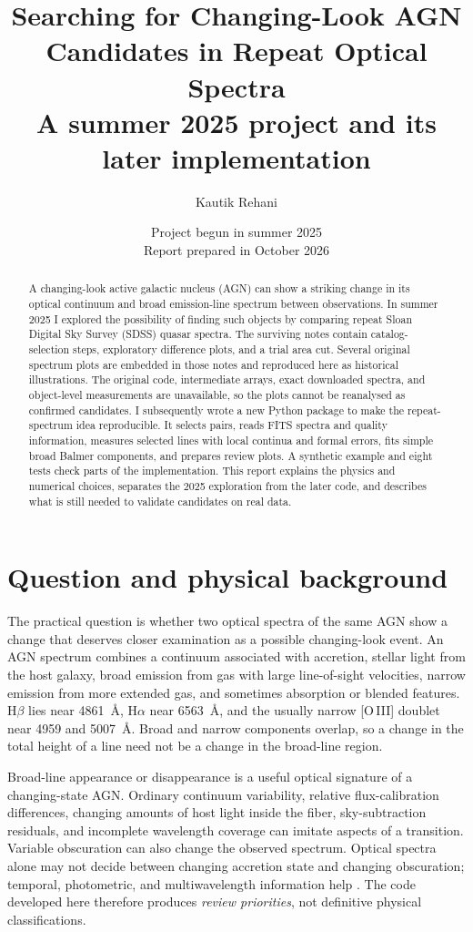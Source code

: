 \documentclass[11pt,a4paper]{article}
\title{Searching for Changing-Look AGN Candidates in Repeat Optical Spectra\\
\large A summer 2025 project and its later implementation}
\author{Kautik Rehani}
\date{Project begun in summer 2025\\Report prepared in October 2026}
\begin{document}
\maketitle

\begin{abstract}
A changing-look active galactic nucleus (AGN) can show a striking change in its optical continuum and broad emission-line spectrum between observations. In summer 2025 I explored the possibility of finding such objects by comparing repeat Sloan Digital Sky Survey (SDSS) quasar spectra. The surviving notes contain catalog-selection steps, exploratory difference plots, and a trial area cut. Several original spectrum plots are embedded in those notes and reproduced here as historical illustrations. The original code, intermediate arrays, exact downloaded spectra, and object-level measurements are unavailable, so the plots cannot be reanalysed as confirmed candidates. I subsequently wrote a new Python package to make the repeat-spectrum idea reproducible. It selects pairs, reads FITS spectra and quality information, measures selected lines with local continua and formal errors, fits simple broad Balmer components, and prepares review plots. A synthetic example and eight tests check parts of the implementation. This report explains the physics and numerical choices, separates the 2025 exploration from the later code, and describes what is still needed to validate candidates on real data.
\end{abstract}

\tableofcontents
\clearpage

\section{Question and physical background}
The practical question is whether two optical spectra of the same AGN show a change that deserves closer examination as a possible changing-look event. An AGN spectrum combines a continuum associated with accretion, stellar light from the host galaxy, broad emission from gas with large line-of-sight velocities, narrow emission from more extended gas, and sometimes absorption or blended features. H$\beta$ lies near 4861~\AA, H$\alpha$ near 6563~\AA, and the usually narrow [O\,III] doublet near 4959 and 5007~\AA. Broad and narrow components overlap, so a change in the total height of a line need not be a change in the broad-line region.

Broad-line appearance or disappearance is a useful optical signature of a changing-state AGN. Ordinary continuum variability, relative flux-calibration differences, changing amounts of host light inside the fiber, sky-subtraction residuals, and incomplete wavelength coverage can imitate aspects of a transition. Variable obscuration can also change the observed spectrum. Optical spectra alone may not decide between changing accretion state and changing obscuration; temporal, photometric, and multiwavelength information help \cite{ricci2023,guo2024}. The code developed here therefore produces \emph{review priorities}, not definitive physical classifications.
\end{document}
